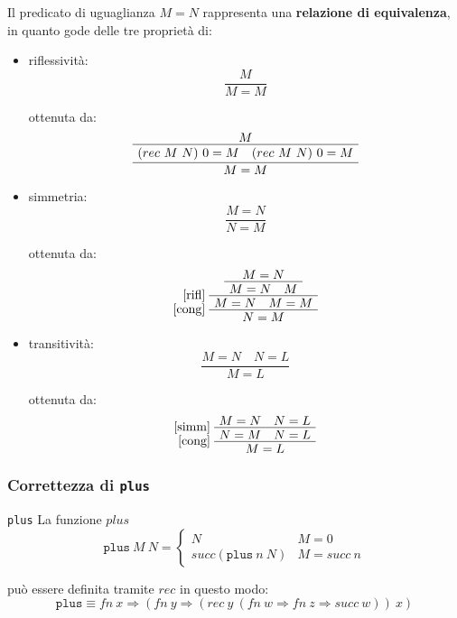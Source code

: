 \documentclass[a4paper,11pt]{report}
\begin{document}
Il predicato di uguaglianza \( M = N \) rappresenta una \textbf{relazione di equivalenza}, in quanto gode delle tre proprietà di:
\begin{itemize}
    \item riflessività:
        \[ \frac{M}{M = M} \]

        \begin{pframe}{}
            ottenuta da:
\[
\AxiomC{$M$}
\UnaryInfC{$(rec\ M\ N)\ 0 = M \quad (rec\ M\ N)\ 0 = M$}
\UnaryInfC{$M = M$}
\DisplayProof
\]
        \end{pframe}

    \item simmetria:
        \[ \frac{M = N}{N = M} \]

        \begin{pframe}{}
            ottenuta da:
\[
\AxiomC{$M = N$}
\UnaryInfC{$M = N \quad M$}
\LeftLabel{[rifl]}
\UnaryInfC{$M = N \quad M = M$}
\LeftLabel{[cong]}
\UnaryInfC{$N = M$}
\DisplayProof
\]
        \end{pframe}

    \item transitività:
        \[ \frac{M = N \quad N = L}{M = L} \]
        
\begin{pframe}{}
            ottenuta da:
\[
\AxiomC{$M = N \quad N = L$}
\LeftLabel{[simm]}
\UnaryInfC{$N = M \quad N = L$}
\LeftLabel{[cong]}
\UnaryInfC{$M = L$}
\DisplayProof
\]
        \end{pframe}

\end{itemize}

\subsubsection{Correttezza di \texttt{plus}}

\begin{defframe}{\texttt{plus}}{}
    La funzione \( plus \) 
    \[ \texttt{plus} \ M \ N = \begin{cases}
        N & M = 0 \\
        succ(\texttt{plus} \ n \ N) & M = succ \ n
    \end{cases}\]

    può essere definita tramite \( rec \) in questo modo:
    \[ \texttt{plus}\equiv fn \ x \Rightarrow (fn \ y \Rightarrow  (rec \ y \ (fn \ w \Rightarrow fn \ z \Rightarrow succ \ w)) \ x)\]
\end{defframe}
\end{document}
